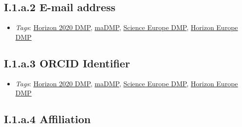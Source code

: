 \documentclass[a4paper,12pt]{report}
\begin{document}
\subsection*{\protect\textcolor{colorSecId}{I.1.a.2} E-mail address}

\label{1e85da40-bbfc-4180-903e-6c569ed2da38.73d686bd-7939-412e-8631-502ee6d9ea7b.e8be8cc6-d323-4b94-8895-68b998582dbf.3a2ffc13-6a0e-4976-bb34-14ab6d938348}


\begin{itemize}
  \item \textit{Tags}: \ul{Horizon 2020 DMP}, \ul{maDMP}, \ul{Science Europe DMP}, \ul{Horizon Europe DMP}
  \end{itemize}





\subsection*{\protect\textcolor{colorSecId}{I.1.a.3} ORCID Identifier}

\label{1e85da40-bbfc-4180-903e-6c569ed2da38.73d686bd-7939-412e-8631-502ee6d9ea7b.e8be8cc6-d323-4b94-8895-68b998582dbf.6295a55d-48d7-4f3c-961a-45b38eeea41f}


\begin{itemize}
  \item \textit{Tags}: \ul{Horizon 2020 DMP}, \ul{maDMP}, \ul{Science Europe DMP}, \ul{Horizon Europe DMP}
  \end{itemize}





\subsection*{\protect\textcolor{colorSecId}{I.1.a.4} Affiliation}

\label{1e85da40-bbfc-4180-903e-6c569ed2da38.73d686bd-7939-412e-8631-502ee6d9ea7b.e8be8cc6-d323-4b94-8895-68b998582dbf.68530470-1f1c-4448-8593-63a288713a66}
\end{document}
